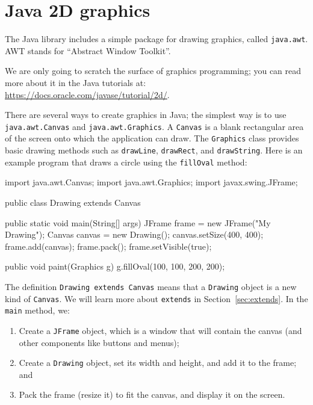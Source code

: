 \documentclass[12pt]{book}
\theoremstyle{exercise}
\newcommand{\java}[1]{\verb"#1"}
\newcommand{\java}[1]{\lstinline{#1}} %
\begin{document}
\backmatter
\appendix


\chapter{Java 2D graphics}
\label{graphics}

The Java library includes a simple package for drawing graphics, called \java{java.awt}.
AWT stands for ``Abstract Window Toolkit''.

We are only going to scratch the surface of graphics programming; you can read more about it in the Java tutorials at: \url{https://docs.oracle.com/javase/tutorial/2d/}.


There are several ways to create graphics in Java; the simplest way is to use \java{java.awt.Canvas} and \java{java.awt.Graphics}.
A \java{Canvas} is a blank rectangular area of the screen onto which the application can draw.
The \java{Graphics} class provides basic drawing methods such as \java{drawLine}, \java{drawRect}, and \java{drawString}.
Here is an example program that draws a circle using the \java{fillOval} method:

\begin{code}
import java.awt.Canvas;
import java.awt.Graphics;
import javax.swing.JFrame;

public class Drawing extends Canvas {

    public static void main(String[] args) {
        JFrame frame = new JFrame("My Drawing");
        Canvas canvas = new Drawing();
        canvas.setSize(400, 400);
        frame.add(canvas);
        frame.pack();
        frame.setVisible(true);
    }

    public void paint(Graphics g) {
        g.fillOval(100, 100, 200, 200);
    }
}
\end{code}

The definition \java{Drawing extends Canvas} means that a \java{Drawing} object is a new kind of \java{Canvas}.
We will learn more about \java{extends} in Section~\ref{sec:extends}.
In the \java{main} method, we:

\begin{enumerate}


\item Create a \java{JFrame} object, which is a window that will contain the canvas (and other components like buttons and menus);

\item Create a \java{Drawing} object, set its width and height, and add it to the frame; and

\item Pack the frame (resize it) to fit the canvas, and display it on the screen.
\end{enumerate}
\end{document}
